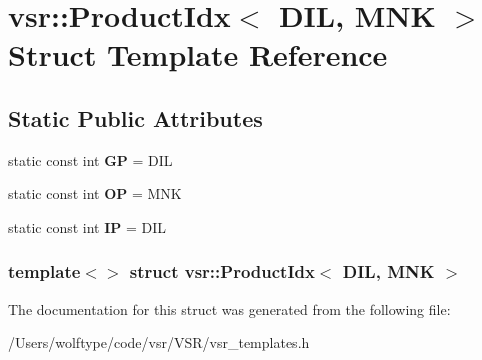 \hypertarget{structvsr_1_1_product_idx_3_01_d_i_l_00_01_m_n_k_01_4}{\section{vsr\-:\-:Product\-Idx$<$ D\-I\-L, M\-N\-K $>$ Struct Template Reference}
\label{structvsr_1_1_product_idx_3_01_d_i_l_00_01_m_n_k_01_4}
}
\subsection*{Static Public Attributes}
\begin{DoxyCompactItemize}
\item 
\hypertarget{structvsr_1_1_product_idx_3_01_d_i_l_00_01_m_n_k_01_4_a5ebfe5cd004a9d0e063bdea12e2c6335}{static const int {\bfseries G\-P} = D\-I\-L}\label{structvsr_1_1_product_idx_3_01_d_i_l_00_01_m_n_k_01_4_a5ebfe5cd004a9d0e063bdea12e2c6335}

\item 
\hypertarget{structvsr_1_1_product_idx_3_01_d_i_l_00_01_m_n_k_01_4_afb0312626b823d072b004090bb7baffa}{static const int {\bfseries O\-P} = M\-N\-K}\label{structvsr_1_1_product_idx_3_01_d_i_l_00_01_m_n_k_01_4_afb0312626b823d072b004090bb7baffa}

\item 
\hypertarget{structvsr_1_1_product_idx_3_01_d_i_l_00_01_m_n_k_01_4_a73286c67ac071cbddd8a84ab7a023c8c}{static const int {\bfseries I\-P} = D\-I\-L}\label{structvsr_1_1_product_idx_3_01_d_i_l_00_01_m_n_k_01_4_a73286c67ac071cbddd8a84ab7a023c8c}

\end{DoxyCompactItemize}
\subsubsection*{template$<$$>$ struct vsr\-::\-Product\-Idx$<$ D\-I\-L, M\-N\-K $>$}



The documentation for this struct was generated from the following file\-:\begin{DoxyCompactItemize}
\item 
/\-Users/wolftype/code/vsr/\-V\-S\-R/vsr\-\_\-templates.\-h\end{DoxyCompactItemize}
